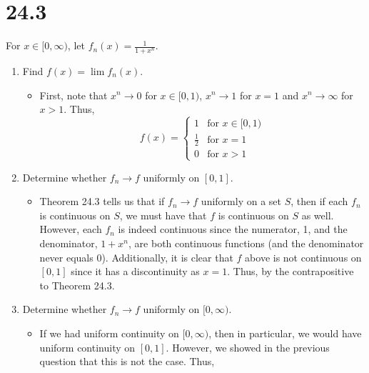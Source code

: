 \documentclass[10pt,a4paper]{article}
\theoremstyle{definition}
\begin{document}
\section*{24.3}
For $x \in [0, \infty)$, let $\displaystyle f_n(x) = \frac{1}{1 + x^n}$.
\begin{enumerate}[label = (\alph*)]
\item Find $f(x) = \lim f_n(x)$.
	\begin{itemize}
	\item First, note that $x^n \to 0$ for $x \in [0,1)$, $x^n \to 1$ for $x = 1$ and $x^n \to \infty$ for $x > 1$. Thus, 
	\[f(x) = \begin{cases}
	1 &\text{for $x \in [0,1)$}\\
	\frac{1}{2} &\text{for $x = 1$}\\
	0 &\text{for $x > 1$}
	\end{cases}\]
	\end{itemize}
\item Determine whether $f_n \to f$ uniformly on $[0,1]$.
	\begin{itemize}
	\item Theorem 24.3 tells us that if $f_n \to f$ uniformly on a set $S$, then if each $f_n$ is continuous on $S$, we must have that $f$ is continuous on $S$ as well. However, each $f_n$ is indeed continuous since the numerator, 1, and the denominator, $1 + x^n$, are both continuous functions (and the denominator never equals 0). Additionally, it is clear that $f$ above is not continuous on $[0,1]$ since it has a discontinuity as $x = 1$. Thus,  by the contrapositive to Theorem 24.3.
	\end{itemize}
\item Determine whether $f_n \to f$ uniformly on $[0, \infty)$.
	\begin{itemize}
	\item If we had uniform continuity on $[0, \infty)$, then in particular, we would have uniform continuity on $[0,1]$. However, we showed in the previous question that this is not the case. Thus, 
	\end{itemize}
\end{enumerate}
\end{document}
